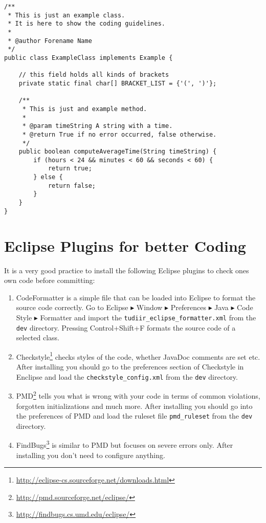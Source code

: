 \begin{codelisting}
\begin{lstlisting}[caption=Example class for coding guidelines,label=lst:CodingStandards,frame=tb]
/**
 * This is just an example class.
 * It is here to show the coding guidelines.
 * 
 * @author Forename Name
 */
public class ExampleClass implements Example {

	// this field holds all kinds of brackets
	private static final char[] BRACKET_LIST = {'(', ')'};

	/**
	 * This is just and example method.
	 * 
	 * @param timeString A string with a time.
	 * @return True if no error occurred, false otherwise.
	 */
	public boolean computeAverageTime(String timeString) {
		if (hours < 24 && minutes < 60 && seconds < 60) {
			return true;
		} else {
			return false;
		}
	}
}
\end{lstlisting}
\end{codelisting}

\section{Eclipse Plugins for better Coding}
\label{sec:eclipseCodingPlugins}

It is a very good practice to install the following Eclipse plugins to check ones own code before committing:

\begin{enumerate}

	\item CodeFormatter is a simple file that can be loaded into Eclipse to format the source code correctly. Go to Eclipse $\blacktriangleright$ Window $\blacktriangleright$ Preferences $\blacktriangleright$ Java $\blacktriangleright$ Code Style $\blacktriangleright$ Formatter and import the \texttt{tudiir\_eclipse\_formatter.xml} from the \texttt{dev} directory. Pressing Control+Shift+F formats the source code of a selected class.

	\item Checkstyle\footnote{\url{http://eclipse-cs.sourceforge.net/downloads.html}} checks styles of the code, whether JavaDoc comments are set etc. After installing you should go to the preferences section of Checkstyle in Enclipse and load the \texttt{checkstyle\_config.xml} from the \texttt{dev} directory.

	\item PMD\footnote{\url{http://pmd.sourceforge.net/eclipse/}} tells you what is wrong with your code in terms of common violations, forgotten initializations and much more. After installing you should go into the preferences of PMD and load the ruleset file \texttt{pmd\_ruleset} from the \texttt{dev} directory.

	\item FindBugs\footnote{\url{http://findbugs.cs.umd.edu/eclipse/}} is similar to PMD but focuses on severe errors only. After installing you don't need to configure anything.

\end{enumerate}

